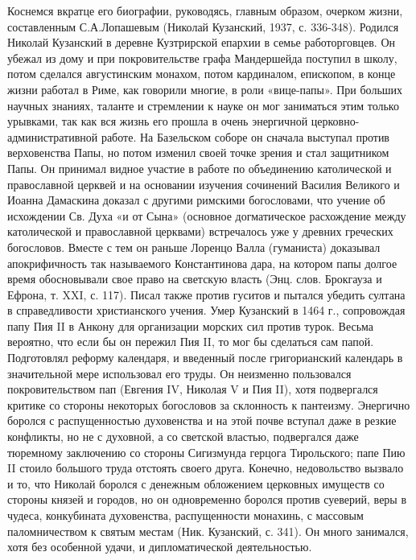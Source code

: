 Коснемся вкратце его биографии, руководясь, главным образом, очерком
жизни, составленным С.А.Лопашевым (Николай Кузанский, 1937, с.
336-348). Родился Николай Кузанский в деревне Кузтрирской епархии в
семье работорговцев. Он убежал из дому и при покровительстве графа
Мандершейда поступил в школу, потом сделался августинским монахом,
потом кардиналом, епископом, в конце жизни работал в Риме, как
говорили многие, в роли «вице-папы». При больших научных знаниях,
таланте и стремлении к науке он мог заниматься этим только урывками,
так как вся жизнь его прошла в очень энергичной
церковно-административной работе. На Базельском соборе он сначала
выступал против верховенства Папы, но потом изменил своей точке зрения
и стал защитником Папы. Он принимал видное участие в работе по
объединению католической и православной церквей и на основании
изучения сочинений Василия Великого и Иоанна Дамаскина доказал с
другими римскими богословами, что учение об исхождении Св. Духа «и от
Сына» (основное догматическое расхождение между католической и
православной церквами) встречалось уже у древних греческих богословов.
Вместе с тем он раньше Лоренцо Валла (гуманиста) доказывал
апокрифичность так называемого Константинова дара, на котором папы
долгое время обосновывали свое право на светскую власть (Энц. слов.
Брокгауза и Ефрона, т. XXI, с. 117). Писал также против гуситов и
пытался убедить султана в справедливости христианского учения. Умер
Кузанский в 1464 г., сопровождая папу Пия II в Анкону для организации
морских сил против турок. Весьма вероятно, что если бы он пережил Пия
II, то мог бы сделаться сам папой. Подготовлял реформу календаря, и
введенный после григорианский календарь в значительной мере
использовал его труды. Он неизменно пользовался покровительством пап
(Евгения IV, Николая V и Пия II), хотя подвергался критике со стороны
некоторых богословов за склонность к пантеизму. Энергично боролся с
распущенностью духовенства и на этой почве вступал даже в резкие
конфликты, но не с духовной, а со светской властью, подвергался даже
тюремному заключению со стороны Сигизмунда герцога Тирольского; папе
Пию II стоило большого труда отстоять своего друга. Конечно,
недовольство вызвало и то, что Николай боролся с денежным обложением
церковных имуществ со стороны князей и городов, но он одновременно
боролся против суеверий, веры в чудеса, конкубината духовенства,
распущенности монахинь, с массовым паломничеством к святым местам
(Ник. Кузанский, с. 341). Он много занимался, хотя без особенной
удачи, и дипломатической деятельностью.

